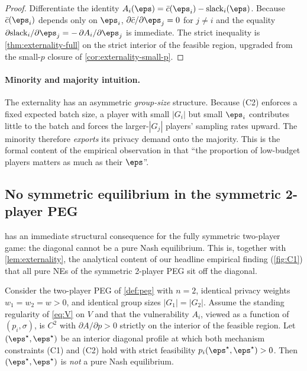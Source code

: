 \begin{proof}
Differentiate the identity $A_i(\boldsymbol{\eps}) = \bar c(\eps_i)
- \mathrm{slack}_i(\boldsymbol{\eps})$. Because $\bar c(\eps_i)$ depends
only on $\eps_i$, $\partial \bar c / \partial \eps_j = 0$ for $j\neq i$
and the equality $\partial \mathrm{slack}_i / \partial \eps_j =
-\,\partial A_i / \partial \eps_j$ is immediate. The strict inequality
is \cref{thm:externality-full} on the strict interior of the feasible
region, upgraded from the small-$p$ closure of
\cref{cor:externality-small-p}.
\end{proof}

\paragraph{Minority and majority intuition.}
The externality has an asymmetric \emph{group-size} structure. Because (C2)
enforces a fixed expected batch size, a player with small $|G_i|$ but
small $\eps_i$ contributes little to the batch and forces the
larger-$|G_j|$ players' sampling rates upward. The minority therefore
\emph{exports} its privacy demand onto the majority. This is the formal
content of the empirical observation in \cite{kaiser2026your}
that ``the proportion of low-budget players matters as much as their
$\eps$''.

\subsection{No symmetric equilibrium in the symmetric 2-player PEG}
\label{sec:no-symmetric-ne}

 has an immediate structural consequence for the
fully symmetric two-player game: the diagonal cannot be a pure Nash
equilibrium. This is, together with \cref{lem:externality}, the
analytical content of our headline empirical finding (\cref{fig:C1}) that
all pure NEs of the symmetric 2-player PEG sit off the diagonal.

\begin{proposition}
\label{prop:no-symmetric-ne}
Consider the two-player PEG of \cref{def:peg} with $n = 2$, identical
privacy weights $w_1 = w_2 = w > 0$, and identical group sizes
$|G_1| = |G_2|$. Assume the standing regularity of \cref{eq:V} on $V$ and
that the vulnerability $A_i$, viewed as a function of $(p_i,\sigma)$, is
$C^2$ with $\partial A / \partial p > 0$ strictly on the interior of the
feasible region. Let $(\eps^\star, \eps^\star)$ be an interior diagonal
profile at which both mechanism constraints (C1) and (C2) hold with strict
feasibility $p_i(\eps^\star, \eps^\star) > 0$. Then $(\eps^\star,
\eps^\star)$ is \emph{not} a pure Nash equilibrium.
\end{proposition}

